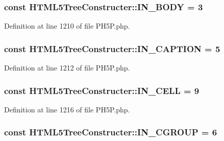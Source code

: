 \hypertarget{classHTML5TreeConstructer_a96dac03a6175a99d9c2b8061e3d91313}{
\subsubsection[{I\+N\+\_\+\+B\+O\+D\+Y}]{\setlength{\rightskip}{0pt plus 5cm}const H\+T\+M\+L5\+Tree\+Constructer\+::\+I\+N\+\_\+\+B\+O\+D\+Y = 3}}\label{classHTML5TreeConstructer_a96dac03a6175a99d9c2b8061e3d91313}


Definition at line 1210 of file P\+H5\+P.\+php.

\hypertarget{classHTML5TreeConstructer_a9f9f002cd7a7a52ebd86ce97f2949f3f}{
\subsubsection[{I\+N\+\_\+\+C\+A\+P\+T\+I\+O\+N}]{\setlength{\rightskip}{0pt plus 5cm}const H\+T\+M\+L5\+Tree\+Constructer\+::\+I\+N\+\_\+\+C\+A\+P\+T\+I\+O\+N = 5}}\label{classHTML5TreeConstructer_a9f9f002cd7a7a52ebd86ce97f2949f3f}


Definition at line 1212 of file P\+H5\+P.\+php.

\hypertarget{classHTML5TreeConstructer_a51864d0a059b9018f6ec895400802d06}{
\subsubsection[{I\+N\+\_\+\+C\+E\+L\+L}]{\setlength{\rightskip}{0pt plus 5cm}const H\+T\+M\+L5\+Tree\+Constructer\+::\+I\+N\+\_\+\+C\+E\+L\+L = 9}}\label{classHTML5TreeConstructer_a51864d0a059b9018f6ec895400802d06}


Definition at line 1216 of file P\+H5\+P.\+php.

\hypertarget{classHTML5TreeConstructer_a8bf6f6afa477e700461837f1464a94b8}{
\subsubsection[{I\+N\+\_\+\+C\+G\+R\+O\+U\+P}]{\setlength{\rightskip}{0pt plus 5cm}const H\+T\+M\+L5\+Tree\+Constructer\+::\+I\+N\+\_\+\+C\+G\+R\+O\+U\+P = 6}}\label{classHTML5TreeConstructer_a8bf6f6afa477e700461837f1464a94b8}


